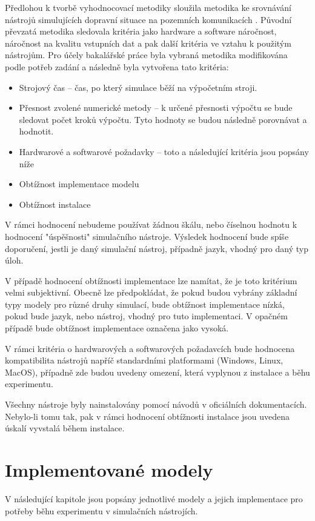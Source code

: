 Předlohou k tvorbě vyhodnocovací metodiky sloužila metodika ke srovnávání nástrojů simulujících dopravní situace na pozemních komunikacích \cite{jones2004traffic}.  Původní převzatá metodika sledovala kritéria jako hardware a software náročnost, náročnost na kvalitu vstupních dat a pak další kritéria ve vztahu k použitým nástrojům. Pro účely bakalářské práce byla vybraná metodika modifikována podle potřeb zadání a následně byla vytvořena tato kritéria:
\begin{itemize}
    \item Strojový čas -- čas, po který simulace běží na výpočetním stroji.
    \item Přesnost zvolené numerické metody -- k určené přesnosti výpočtu se bude sledovat počet kroků výpočtu. Tyto hodnoty se budou následně porovnávat a hodnotit.
    \item Hardwarové a softwarové požadavky -- toto a následující kritéria jsou popsány níže
    \item Obtížnost implementace modelu
    \item Obtížnost instalace
\end{itemize}

V rámci hodnocení nebudeme používat žádnou škálu, nebo číselnou hodnotu k hodnocení "úspěšnosti" simulačního nástroje. Výsledek hodnocení bude spíše doporučení, jestli je daný simulační nástroj, případně jazyk, vhodný pro daný typ úloh.

V případě hodnocení obtížnosti implementace lze namítat, že je toto kritérium velmi subjektivní. Obecně lze předpokládat, že pokud budou vybrány základní typy modely pro různé druhy simulací, bude obtížnost implementace nízká, pokud bude jazyk, nebo nástroj, vhodný pro tuto implementaci. V opačném případě bude obtížnost implementace označena jako vysoká.

V rámci kritéria o hardwarových a softwarových požadavcích bude hodnocena kompatibilita nástrojů napříč standardními platformami (Windows, Linux, MacOS), případně zde budou uvedeny omezení, která vyplynou z instalace a běhu experimentu.

Všechny nástroje byly nainstalovány pomocí návodů v oficiálních dokumentacích. Nebylo-li tomu tak, pak v rámci hodnocení obtížnosti instalace jsou uvedena úskalí vyvstalá během instalace.


\section{Implementované modely}
\label{implementace}
V následující kapitole jsou popsány jednotlivé modely a jejich implementace pro potřeby běhu experimentu v simulačních nástrojích.

